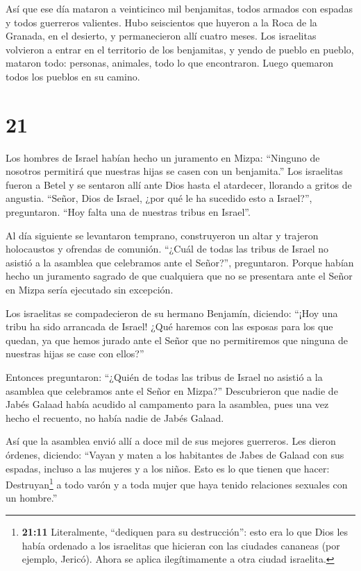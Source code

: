  Así que ese día mataron a veinticinco mil benjamitas,
todos armados con espadas y todos guerreros valientes. 
Hubo seiscientos que huyeron a la Roca de la Granada, en el desierto, y
permanecieron allí cuatro meses.  Los israelitas volvieron
a entrar en el territorio de los benjamitas, y yendo de pueblo en
pueblo, mataron todo: personas, animales, todo lo que encontraron. Luego
quemaron todos los pueblos en su camino.

\hypertarget{section-20}{%
\section{21}\label{section-20}}

 Los hombres de Israel habían hecho un juramento en Mizpa:
``Ninguno de nosotros permitirá que nuestras hijas se casen con un
benjamita.''  Los israelitas fueron a Betel y se sentaron
allí ante Dios hasta el atardecer, llorando a gritos de angustia.
 ``Señor, Dios de Israel, ¿por qué le ha sucedido esto a
Israel?'', preguntaron. ``Hoy falta una de nuestras tribus en Israel''.

 Al día siguiente se levantaron temprano, construyeron un
altar y trajeron holocaustos y ofrendas de comunión. 
``¿Cuál de todas las tribus de Israel no asistió a la asamblea que
celebramos ante el Señor?'', preguntaron. Porque habían hecho un
juramento sagrado de que cualquiera que no se presentara ante el Señor
en Mizpa sería ejecutado sin excepción.

 Los israelitas se compadecieron de su hermano Benjamín,
diciendo: ``¡Hoy una tribu ha sido arrancada de Israel! 
¿Qué haremos con las esposas para los que quedan, ya que hemos jurado
ante el Señor que no permitiremos que ninguna de nuestras hijas se case
con ellos?''

 Entonces preguntaron: ``¿Quién de todas las tribus de
Israel no asistió a la asamblea que celebramos ante el Señor en Mizpa?''
Descubrieron que nadie de Jabés Galaad había acudido al campamento para
la asamblea,  pues una vez hecho el recuento, no había nadie
de Jabés Galaad.

 Así que la asamblea envió allí a doce mil de sus mejores
guerreros. Les dieron órdenes, diciendo: ``Vayan y maten a los
habitantes de Jabes de Galaad con sus espadas, incluso a las mujeres y a
los niños.  Esto es lo que tienen que hacer:
Destruyan\footnote{\textbf{21:11} Literalmente, ``dediquen para su
  destrucción'': esto era lo que Dios les había ordenado a los
  israelitas que hicieran con las ciudades cananeas (por ejemplo,
  Jericó). Ahora se aplica ilegítimamente a otra ciudad israelita.} a
todo varón y a toda mujer que haya tenido relaciones sexuales con un
hombre.''

